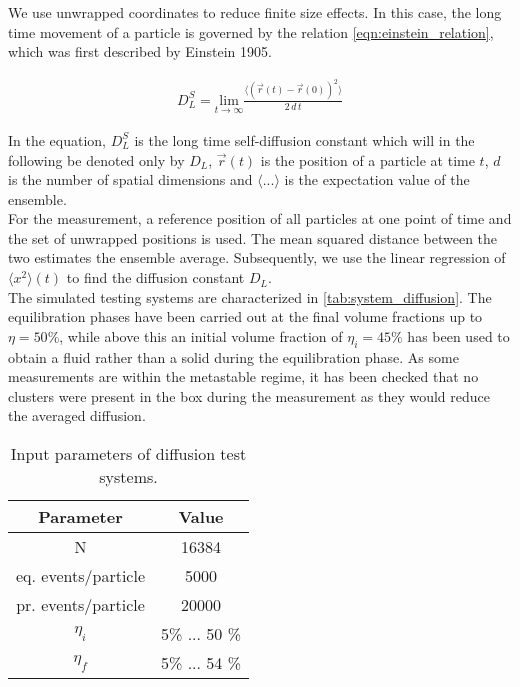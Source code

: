 We use unwrapped coordinates to reduce finite size effects. In this case, the long time movement of a particle is governed by the relation \autoref{eqn:einstein_relation}, which was first described by Einstein 1905\cite{Albert1905}.

\begin{align}
\label{eqn:einstein_relation}
D^S_L = \underset{t\rightarrow \infty}{\text{lim}} \frac{\langle (\vec{r}(t) - \vec{r}(0) )^2 \rangle}{ 2 \, d \, t}
\end{align}

In the equation, $D^S_L$ is the long time self-diffusion constant which will in the following be denoted only by $D_L$, $\vec{r}(t)$ is the position of a particle at time $t$, $d$ is the number of spatial dimensions and $\langle ... \rangle$ is the expectation value of the ensemble.\\

For the measurement, a reference position of all particles at one point of time and the set of unwrapped positions is used. The mean squared distance between the two estimates the ensemble average. Subsequently, we use the linear regression of $\langle x^2 \rangle (t)$ to find the diffusion constant $D_L$.\\

The simulated testing systems are characterized in \autoref{tab:system_diffusion}. The equilibration phases have been carried out at the final volume fractions up to $\eta = 50\%$, while above this an initial volume fraction of $\eta_i = 45\%$ has been used to obtain a fluid rather than a solid during the equilibration phase. As some measurements are within the metastable regime, it has been checked that no clusters were present in the box during the measurement as they would reduce the averaged diffusion.\\

\begin{table}[h]
\centering
\begin{tabular}{c|c}
Parameter & Value \\ \hline
N & 16384 \\
eq. events/particle & 5000 \\
pr. events/particle & 20000 \\
$\eta_i$ & 5\% ... 50 \% \\
$\eta_f$ & 5\% ... 54 \% \\
\end{tabular}
\caption[Simulation parameters for diffusion measurement]{Input parameters of diffusion test systems.}
\label{tab:system_diffusion}
\end{table}

